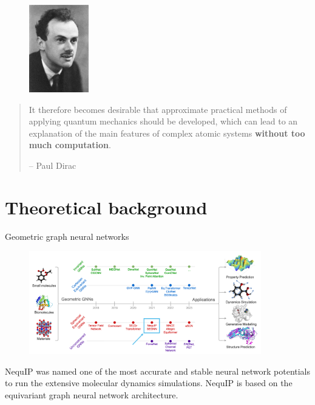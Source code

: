 \documentclass[11pt,t]{beamer}
\begin{document}
\begin{frame}
	\vspace{-5pt}
	\begin{figure}
		\centering
		\includegraphics[width=0.23\textwidth]{Figures/introduction_paul_dirac.jpg}
	\end{figure}
	\small
	\begin{quotation}
		It therefore becomes desirable that approximate practical methods of applying quantum mechanics should be developed, which can lead to an explanation of the main features of complex atomic systems \textbf{without too much computation}.

		\raggedleft	\normalfont --  Paul Dirac
	\end{quotation}
\end{frame}



\section{Theoretical background}
\begin{frame}{Geometric graph neural networks}
	\vspace{-10pt}
	\begin{figure}
		\centering
		\includegraphics[width=0.9\textwidth]{Figures/theory_geometric_gnns.png}
	\end{figure}
	\small
	NequIP was named one of the most accurate and stable neural network potentials to run the extensive molecular dynamics simulations. NequIP is based on the equivariant graph neural network architecture.
\end{frame}
\end{document}
